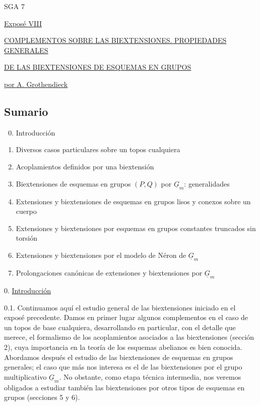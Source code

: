 
\begin{center}
SGA 7

\vspace{1em}
\underline{Expos\'e VIII}

\vspace{1em}
\underline{\underline{COMPLEMENTOS SOBRE LAS BIEXTENSIONES. PROPIEDADES GENERALES}}

\underline{\underline{DE LAS BIEXTENSIONES DE ESQUEMAS EN GRUPOS}}

\vspace{1em}
\underline{por A. Grothendieck}
\end{center}

\subsection*{Sumario}

\begin{enumerate}[label=\arabic*.]
\setcounter{enumi}{-1}
\item Introducción
\item Diversos casos particulares sobre un topos cualquiera
\item Acoplamientos definidos por una biextensión
\item Biextensiones de esquemas en grupos $(P,Q)$ por $\underline G_m$: generalidades
\item Extensiones y biextensiones de esquemas en grupos lisos y conexos sobre un cuerpo
\item Extensiones y biextensiones por esquemas en grupos constantes truncados sin torsión
\item Extensiones y biextensiones por el modelo de Néron de $\underline G_m$
\item Prolongaciones canónicas de extensiones y biextensiones por $\underline G_m$
\end{enumerate}

0. \underline{Introducción}

0.1. Continuamos aquí el estudio general de las biextensiones iniciado
en el exposé precedente. Damos en primer lugar algunos complementos en
el caso de un topos de base cualquiera, desarrollando en particular,
con el detalle que merece, el formalismo de los acoplamientos asociados
a las biextensiones (sección 2), cuya importancia en la teoría de los
esquemas abelianos es bien conocida. Abordamos después el estudio de
las biextensiones de esquemas en grupos generales; el caso que más nos
interesa es el de las biextensiones por el grupo multiplicativo
$\underline G_m$. No obstante, como etapa técnica intermedia, nos veremos
obligados a estudiar también las biextensiones por otros tipos de
esquemas en grupos (secciones 5 y 6).

